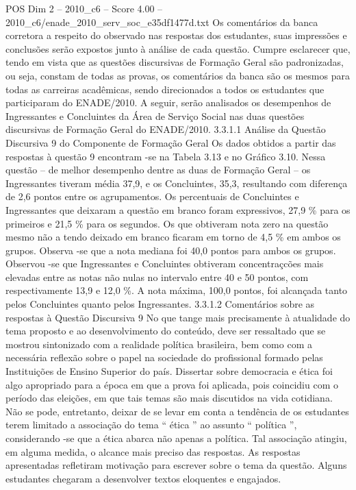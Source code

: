 \begin{textsample}{POS Dim 2 – 2010\_c6 – Score 4.00 – 2010\_c6/enade\_2010\_serv\_soc\_e35df1477d.txt}
Os comentários da banca corretora a respeito do observado nas respostas dos estudantes, suas impressões e conclusões serão expostos junto à análise de cada questão.
Cumpre esclarecer que, tendo em vista que as questões discursivas de Formação Geral são padronizadas, ou seja, constam de todas as provas, os comentários da banca são os mesmos para todas as carreiras acadêmicas, sendo direcionados a todos os estudantes que participaram do ENADE/2010.
A seguir, serão analisados os desempenhos de Ingressantes e Concluintes da Área de Serviço Social nas duas questões discursivas de Formação Geral do ENADE/2010. 3.3.1.1 Análise da Questão Discursiva 9 do Componente de Formação Geral Os dados obtidos a partir das respostas à questão 9 encontram -se na Tabela 3.13 e no Gráfico 3.10.
Nessa questão – de melhor desempenho dentre as duas de Formação Geral – os Ingressantes tiveram média 37,9, e os Concluintes, 35,3, resultando com diferença de 2,6 pontos entre os agrupamentos.
Os percentuais de Concluintes e Ingressantes que deixaram a questão em branco foram expressivos, 27,9 \% para os primeiros e 21,5 \% para os segundos.
Os que obtiveram nota zero na questão mesmo não a tendo deixado em branco ficaram em torno de 4,5 \% em ambos os grupos.
Observa -se que a nota mediana foi 40,0 pontos para ambos os grupos.
Observou -se que Ingressantes e Concluintes obtiveram concentraçcões mais elevadas entre as notas não nulas no intervalo entre 40 e 50 pontos, com respectivamente 13,9 e 12,0 \%.
A nota máxima, 100,0 pontos, foi alcançada tanto pelos Concluintes quanto pelos Ingressantes. 3.3.1.2 Comentários sobre as respostas à Questão Discursiva 9 No que tange mais precisamente à atualidade do tema proposto e ao desenvolvimento do conteúdo, deve ser ressaltado que se mostrou sintonizado com a realidade política brasileira, bem como com a necessária reflexão sobre o papel na sociedade do profissional formado pelas Instituições de Ensino Superior do país.
Dissertar sobre democracia e ética foi algo apropriado para a época em que a prova foi aplicada, pois coincidiu com o período das eleições, em que tais temas são mais discutidos na vida cotidiana.
Não se pode, entretanto, deixar de se levar em conta a tendência de os estudantes terem limitado a associação do tema “ ética ” ao assunto “ política ”, considerando -se que a ética abarca não apenas a política.
Tal associação atingiu, em alguma medida, o alcance mais preciso das respostas.
As respostas apresentadas refletiram motivação para escrever sobre o tema da questão.
Alguns estudantes chegaram a desenvolver textos eloquentes e engajados.

\end{textsample}

